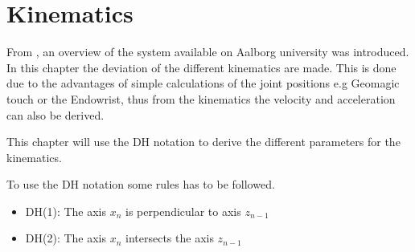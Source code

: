 \chapter{Kinematics}\label{cha:kinematic}

From , an overview of the system available on Aalborg university was introduced. In this chapter the deviation of the different kinematics are made. This is done due to the advantages of simple calculations of the joint positions e.g Geomagic touch or the Endowrist, thus from the kinematics the velocity and acceleration can also be derived.

This chapter will use the \gls{DH} notation to derive the different parameters for the kinematics. 

To use the \gls{DH} notation some rules has to be followed. 

\begin{itemize}
\item DH(1): The axis $x_n$ is perpendicular to axis $z_{n-1}$
\item DH(2): The axis $x_n$ intersects the axis $z_{n-1}$
\end{itemize}






